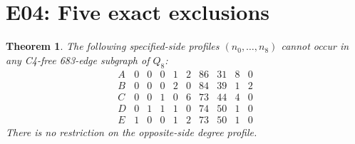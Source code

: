 \documentclass{article}
\newtheorem{theorem}{Theorem}
\begin{document}
\section{E04: Five exact exclusions}
\begin{theorem}
The following specified-side profiles $(n_0,\ldots,n_8)$ cannot occur
in any C4-free 683-edge subgraph of $Q_8$:
\[
\begin{array}{c|rrrrrrrrr}
 A&0&0&0&1&2&86&31&8&0\\
 B&0&0&0&2&0&84&39&1&2\\
 C&0&0&1&0&6&73&44&4&0\\
 D&0&1&1&1&0&74&50&1&0\\
 E&1&0&0&1&2&73&50&1&0
\end{array}
\]
There is no restriction on the opposite-side degree profile.
\end{theorem}
\end{document}
